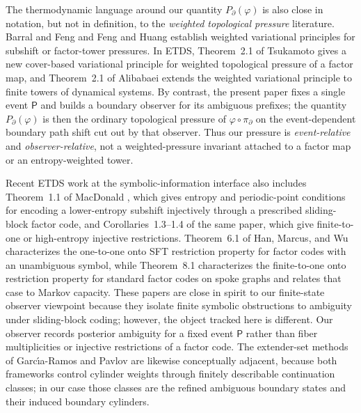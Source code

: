 \documentclass{etds}%
\numberwithin{equation}{section}
\theoremstyle{plain}
\theoremstyle{definition}
\theoremstyle{remark}
\begin{document}
The thermodynamic language around our quantity $P_\partial(\varphi)$ is also
close in notation, but not in definition, to the \emph{weighted topological
pressure} literature.  Barral and Feng
\cite[Theorem~3.1]{BarralFeng2012WeightedThermodynamic} and Feng and Huang
\cite[Theorem~1.4 and Corollary~1.5]{FengHuang2016WeightedPressure} establish
weighted variational principles for subshift or factor-tower pressures.  In
ETDS, Theorem~2.1 of Tsukamoto \cite{Tsukamoto2023WeightedPressure} gives a
new cover-based variational principle for weighted topological pressure of a
factor map, and Theorem~2.1 of Alibabaei
\cite{Alibabaei2025WeightedPressure} extends the weighted variational
principle to finite towers of dynamical systems.  By contrast, the present
paper fixes a single event
$\mathsf{P}$ and builds a boundary observer for its ambiguous prefixes; the
quantity $P_\partial(\varphi)$ is then the ordinary topological pressure of
$\varphi\circ\pi_\partial$ on the event-dependent boundary path shift cut out
by that observer.  Thus our pressure is \emph{event-relative} and
\emph{observer-relative}, not a weighted-pressure invariant attached to a
factor map or an entropy-weighted tower.

Recent ETDS work at the symbolic-information interface also includes
Theorem~1.1 of MacDonald \cite{MacDonald2024}, which gives entropy and
periodic-point conditions for encoding a lower-entropy subshift injectively
through a prescribed sliding-block factor code, and Corollaries~1.3--1.4 of
the same paper, which give finite-to-one or high-entropy injective
restrictions.  Theorem~6.1 of Han, Marcus, and Wu
\cite{HanMarcusWu2024} characterizes the one-to-one onto SFT restriction
property for factor codes with an unambiguous symbol, while Theorem~8.1
characterizes the finite-to-one onto restriction property for standard factor
codes on spoke graphs and relates that case to Markov capacity.  These papers
are close in spirit to our finite-state observer
viewpoint because they isolate finite symbolic obstructions to ambiguity under
sliding-block coding; however, the object tracked here is different.  Our
observer records posterior ambiguity for a fixed event $\mathsf{P}$ rather
than fiber multiplicities or injective restrictions of a factor code.  The
extender-set methods of Garc{\'\i}a-Ramos and Pavlov are likewise
conceptually adjacent, because both frameworks control cylinder weights
through finitely describable continuation classes; in our case those classes
are the refined ambiguous boundary states and their induced boundary
cylinders.
\end{document}
